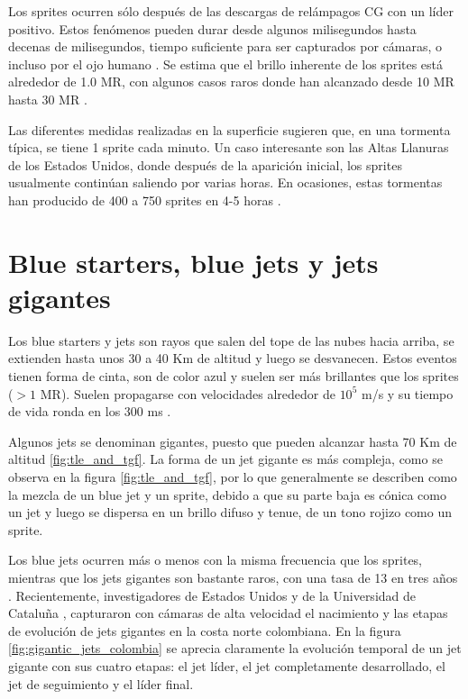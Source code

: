 \documentclass[12pt,oneside,openany,letter]{book}
\begin{document}
Los sprites ocurren sólo después de las descargas de relámpagos CG con un líder positivo. Estos fenómenos pueden durar desde algunos milisegundos hasta decenas de milisegundos, tiempo suficiente para ser capturados por cámaras, o incluso por el ojo humano \cite{Maiorana2014}. Se estima que el brillo inherente de los sprites está alrededor de 1.0 MR, con algunos casos raros donde han alcanzado desde 10 MR hasta 30 MR \cite{FullekrugEtal2006}. 

Las diferentes medidas realizadas en la superficie sugieren que, en una tormenta típica, se tiene 1 sprite cada minuto. Un caso interesante son las Altas Llanuras de los Estados Unidos, donde después de la aparición inicial, los sprites usualmente continúan saliendo por varias horas. En ocasiones, estas tormentas han producido de 400 a 750 sprites en 4-5 horas \cite{FullekrugEtal2006}.

\section{Blue starters, blue jets y jets gigantes}
Los blue starters y jets son rayos que salen del tope de las nubes hacia arriba, se extienden hasta unos 30 a 40 Km de altitud y luego se desvanecen. Estos eventos tienen forma de cinta, son de color azul y suelen ser más brillantes que los sprites ($>1$ MR). Suelen propagarse con velocidades alrededor de $10^5$ m/s y su tiempo de vida ronda en los 300 ms \cite{DwyerUman2014}. 

Algunos jets se denominan gigantes, puesto que pueden alcanzar hasta 70 Km de altitud \ref{fig:tle_and_tgf}. La forma de un jet gigante es más compleja, como se observa en la figura \ref{fig:tle_and_tgf}, por lo que generalmente se describen como la mezcla de un blue jet y un sprite, debido a que su parte baja es cónica como un jet y luego se dispersa en un brillo difuso y tenue, de un tono rojizo como un sprite. 

Los blue jets ocurren más o menos con la misma frecuencia que los sprites, mientras que los jets gigantes son bastante raros, con una tasa de 13 en tres años \cite{chen2008}. Recientemente, investigadores de Estados Unidos y de la Universidad de Cataluña \cite{VanEtal2019}, capturaron con cámaras de alta velocidad el nacimiento y las etapas de evolución de jets gigantes en la costa norte colombiana. En la figura \ref{fig:gigantic_jets_colombia} se aprecia claramente la evolución temporal de un jet gigante con sus cuatro etapas: el jet líder, el jet completamente desarrollado, el jet de seguimiento y el líder final. 
\end{document}

